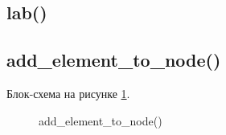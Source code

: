 
\subsection{lab()}








\subsection{add\_element\_to\_node()}

Блок-схема на рисунке \ref{fig:add_element_to_node}.

\begin{figure}[pht]
    \caption{add\_element\_to\_node()}
    \label{fig:add_element_to_node}
\end{figure}

